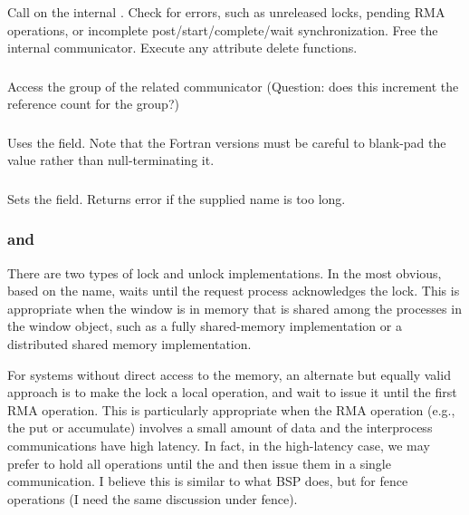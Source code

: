 \documentclass{article}
\begin{document}
\subsubsection{}
Call  on the internal .
Check for errors, such as unreleased locks, pending RMA operations, or
incomplete 
post/start/complete/wait synchronization.
Free the internal communicator.  Execute any attribute delete functions.

\subsubsection{}
Access the group of the related communicator (Question: does this increment the
reference count for the group?)

\subsubsection{}
Uses the  field.  Note that the Fortran versions
must be careful to blank-pad the value rather than null-terminating it.

\subsubsection{}
Sets the  field.  Returns error if the supplied name
is too long. 

\subsubsection{ and }
There are two types of lock and unlock implementations.  In the most
obvious, based on the name,  waits until the
request process acknowledges the lock. This is appropriate when the
window is in memory that is shared among the processes in the window
object, such as a fully shared-memory implementation or a distributed
shared memory implementation.

For systems without direct access to the memory, an alternate but
equally valid approach is to make the lock a local operation, and wait
to issue it until the first RMA operation.  This is particularly
appropriate when the RMA operation (e.g., the put or accumulate)
involves a small amount of data and the interprocess communications
have high latency.  In fact, in the high-latency case, we may prefer
to hold all operations until the  and then issue
them in a single communication.  I believe this is similar to what BSP
does, but for fence operations (I need the same discussion under fence).
\end{document}
